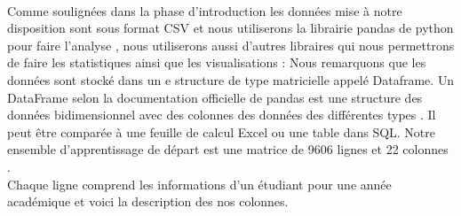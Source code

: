 \paragraph{}
Comme soulignées dans la phase d'introduction les données mise à notre
disposition sont sous format \ac {CSV} et nous utiliserons la librairie pandas de python pour faire l'analyse , nous utiliserons aussi d'autres libraires qui nous permettrons de faire les statistiques ainsi que les visualisations :
Nous remarquons que les données sont stocké dans un e structure de type
matricielle appelé Dataframe. \cite{pedregosa2011scikit}
Un DataFrame selon la documentation officielle de pandas est une
structure des données bidimensionnel avec des colonnes des données des différentes types . Il peut être comparée à une feuille de calcul Excel ou une table dans \ac{SQL}.
Notre ensemble d'apprentissage de départ est une matrice de 9606 lignes et  22 colonnes .\\
Chaque ligne comprend les informations d'un étudiant pour une année académique et voici la description des nos colonnes.\\ 
